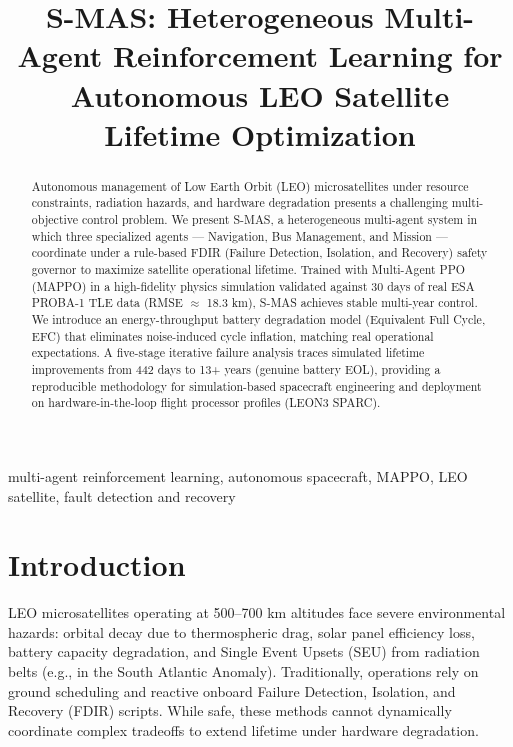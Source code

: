 \documentclass[conference]{IEEEtran}
\begin{document}
\title{S-MAS: Heterogeneous Multi-Agent Reinforcement Learning for Autonomous LEO Satellite Lifetime Optimization}

\author{
}

\maketitle

\begin{abstract}
Autonomous management of Low Earth Orbit (LEO) microsatellites under resource constraints, radiation hazards, and hardware degradation presents a challenging multi-objective control problem. We present S-MAS, a heterogeneous multi-agent system in which three specialized agents — Navigation, Bus Management, and Mission — coordinate under a rule-based FDIR (Failure Detection, Isolation, and Recovery) safety governor to maximize satellite operational lifetime. Trained with Multi-Agent PPO (MAPPO) in a high-fidelity physics simulation validated against 30 days of real ESA PROBA-1 TLE data (RMSE $\approx$ 18.3 km), S-MAS achieves stable multi-year control. We introduce an energy-throughput battery degradation model (Equivalent Full Cycle, EFC) that eliminates noise-induced cycle inflation, matching real operational expectations. A five-stage iterative failure analysis traces simulated lifetime improvements from 442 days to 13+ years (genuine battery EOL), providing a reproducible methodology for simulation-based spacecraft engineering and deployment on hardware-in-the-loop flight processor profiles (LEON3 SPARC).
\end{abstract}

\begin{IEEEkeywords}
multi-agent reinforcement learning, autonomous spacecraft, MAPPO, LEO satellite, fault detection and recovery
\end{IEEEkeywords}

\section{Introduction}
LEO microsatellites operating at 500--700 km altitudes face severe environmental hazards: orbital decay due to thermospheric drag, solar panel efficiency loss, battery capacity degradation, and Single Event Upsets (SEU) from radiation belts (e.g., in the South Atlantic Anomaly). Traditionally, operations rely on ground scheduling and reactive onboard Failure Detection, Isolation, and Recovery (FDIR) scripts. While safe, these methods cannot dynamically coordinate complex tradeoffs to extend lifetime under hardware degradation.
\end{document}
